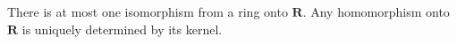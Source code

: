 There is at most one isomorphism from a ring onto $\mathbf{R}$. Any homomorphism onto $\mathbf{R}$ is uniquely determined by its kernel.
